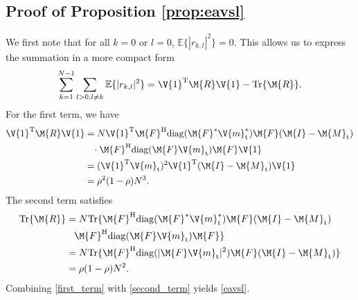 \documentclass[journal,a4paper,10pt, romanappendices]{IEEEtran}
\begin{document}
\subsection{Proof of Proposition \ref{prop:eavsl}}\label{sec:proof_eavsl}
\begin{IEEEproof}
We first note that for all $k=0$ or $l=0$, $\mathbb{E}\{|r_{k,l}|^2\}=0$. This allows us to express the summation in a more compact form
$$
\sum_{k=1}^{N-1}\sum_{l>0,l\neq k} \mathbb{E}\{|r_{k,l}|^2\} = \V{1}^{\rm T}\M{R}\V{1} - {\rm Tr}\{\M{R}\}.
$$
For the first term, we have
\begin{align}\label{first_term}
\V{1}^{\rm T}\M{R}\V{1} &= N\V{1}^{\rm T}\M{F}^{\rm H}{\rm diag}(\M{F}^*\V{m}_{\rm t}^*)\M{F}(\M{I}-\M{M}_{\rm t})\nonumber\\
&\hspace{3mm}\cdot\M{F}^{\rm H}{\rm diag}(\M{F}\V{m}_{\rm t})\M{F}\V{1} \nonumber\\
&=(\V{1}^{\rm T}\V{m}_{\rm t})^2 \V{1}^{\rm T}(\M{I}-\M{M}_{\rm t})\V{1} \nonumber \\
&= \rho^2 (1-\rho) N^3.
\end{align}
The second term satisfies
\begin{align}\label{second_term}
{\rm Tr}\{\M{R}\}&=N{\rm Tr}\{\M{F}^{\rm H}{\rm diag}(\M{F}^*\V{m}_{\rm t}^*)\M{F}(\M{I}-\M{M}_{\rm t})\nonumber\\
&\hspace{3mm}\M{F}^{\rm H}{\rm diag}(\M{F}\V{m}_{\rm t})\M{F}\}\nonumber \\
&=N {\rm Tr} \{\M{F}^{\rm H}{\rm diag}(|\M{F}\V{m}_{\rm t}|^2)\M{F}(\M{I}-\M{M}_{\rm t})\}\nonumber \\
&=\rho(1-\rho)N^2.
\end{align}
Combining \eqref{first_term} with \eqref{second_term} yields \eqref{eavsl}.
\end{IEEEproof}
\end{document}

